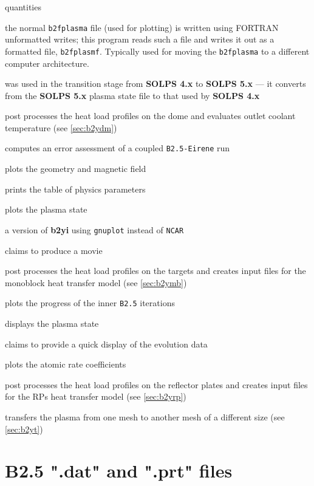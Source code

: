 \documentclass[a4paper,10pt]{report}
\newcommand\SOLPSfour{{\bf SOLPS 4.x} }
\newcommand\SOLPSfive{{\bf SOLPS 5.x} }
\begin{document}
\begin{description}
  quantities
\item[b2uf]  the normal {\tt b2fplasma} file (used for plotting) is
  written using FORTRAN unformatted writes; this program reads such a
  file and writes it out as a formatted file, {\tt b2fplasmf}.
  Typically used for moving the {\tt b2fplasma} to a different
  computer architecture.
\item[b2xd]  was used in the transition stage from \SOLPSfour to \SOLPSfive
  --- it converts from the \SOLPSfive plasma state file to that used by
  \SOLPSfour
\item[\textcolor{Red}{b2ydm}]  post processes the heat load profiles on the dome and evaluates outlet coolant temperature (see \ref{sec:b2ydm})
\item[b2ye]  computes an error assessment of a coupled {\tt B2.5-Eirene} run
\item[b2yg]  plots the geometry and magnetic field
\item[b2yh]  prints the table of physics parameters
\item[b2yi]  plots the plasma state
\item[b2yi\_gnuplot]  a version of {\bf b2yi} using {\tt gnuplot} instead of {\tt NCAR}
\item[b2ym]  claims to produce a movie
\item[\textcolor{Red}{b2ymb}]  post processes the heat load profiles on the targets and creates input files for the monoblock heat transfer model (see \ref{sec:b2ymb})
\item[b2yn]  plots the progress of the inner {\tt B2.5} iterations
\item[b2yp]  displays the plasma state
\item[b2yq]  claims to provide a quick display of the evolution data
\item[b2yr]  plots the atomic rate coefficients
\item[\textcolor{Red}{b2yrp}]  post processes the heat load profiles on the reflector plates and creates input files for the RPs heat transfer model (see \ref{sec:b2yrp})
\item[\textcolor{Red}{b2yt}]  transfers the plasma from one mesh to another mesh of a different size (see \ref{sec:b2yt})
\end{description}

\clearpage
\section{B2.5 ".dat" and ".prt" files}
\label{sec:b2IOfiles}
\end{document}
